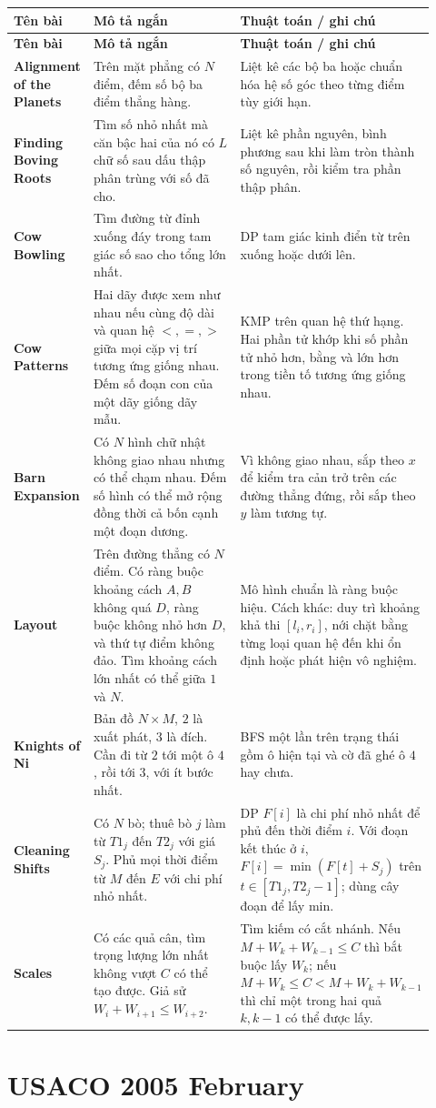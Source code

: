 \documentclass[11pt]{article}
\newenvironment{solutiontable}{%
  \small
  \setlength{\tabcolsep}{4pt}
  \renewcommand{\arraystretch}{1.14}
  \begin{longtable}{L{0.19\linewidth}L{0.39\linewidth}L{0.34\linewidth}}
  \toprule
  \textbf{Tên bài} & \textbf{Mô tả ngắn} & \textbf{Thuật toán / ghi chú}\\
  \midrule
  \endfirsthead
  \toprule
  \textbf{Tên bài} & \textbf{Mô tả ngắn} & \textbf{Thuật toán / ghi chú}\\
  \midrule
  \endhead
}{%
  \bottomrule
  \end{longtable}
  \normalsize
}
\newcommand{\problemrow}[3]{\textbf{#1} & #2 & #3\\\midrule}
\begin{document}
\begin{solutiontable}
\problemrow{Alignment of the Planets}{Trên mặt phẳng có \(N\) điểm, đếm số bộ ba điểm thẳng hàng.}{Liệt kê các bộ ba hoặc chuẩn hóa hệ số góc theo từng điểm tùy giới hạn.}
\problemrow{Finding Boving Roots}{Tìm số nhỏ nhất mà căn bậc hai của nó có \(L\) chữ số sau dấu thập phân trùng với số đã cho.}{Liệt kê phần nguyên, bình phương sau khi làm tròn thành số nguyên, rồi kiểm tra phần thập phân.}
\problemrow{Cow Bowling}{Tìm đường từ đỉnh xuống đáy trong tam giác số sao cho tổng lớn nhất.}{DP tam giác kinh điển từ trên xuống hoặc dưới lên.}
\problemrow{Cow Patterns}{Hai dãy được xem như nhau nếu cùng độ dài và quan hệ \(<,=,>\) giữa mọi cặp vị trí tương ứng giống nhau. Đếm số đoạn con của một dãy giống dãy mẫu.}{KMP trên quan hệ thứ hạng. Hai phần tử khớp khi số phần tử nhỏ hơn, bằng và lớn hơn trong tiền tố tương ứng giống nhau.}
\problemrow{Barn Expansion}{Có \(N\) hình chữ nhật không giao nhau nhưng có thể chạm nhau. Đếm số hình có thể mở rộng đồng thời cả bốn cạnh một đoạn dương.}{Vì không giao nhau, sắp theo \(x\) để kiểm tra cản trở trên các đường thẳng đứng, rồi sắp theo \(y\) làm tương tự.}
\problemrow{Layout}{Trên đường thẳng có \(N\) điểm. Có ràng buộc khoảng cách \(A,B\) không quá \(D\), ràng buộc không nhỏ hơn \(D\), và thứ tự điểm không đảo. Tìm khoảng cách lớn nhất có thể giữa \(1\) và \(N\).}{Mô hình chuẩn là ràng buộc hiệu. Cách khác: duy trì khoảng khả thi \([l_i,r_i]\), nới chặt bằng từng loại quan hệ đến khi ổn định hoặc phát hiện vô nghiệm.}
\problemrow{Knights of Ni}{Bản đồ \(N\times M\), \(2\) là xuất phát, \(3\) là đích. Cần đi từ \(2\) tới một ô \(4\), rồi tới \(3\), với ít bước nhất.}{BFS một lần trên trạng thái gồm ô hiện tại và cờ đã ghé ô \(4\) hay chưa.}
\problemrow{Cleaning Shifts}{Có \(N\) bò; thuê bò \(j\) làm từ \(T1_j\) đến \(T2_j\) với giá \(S_j\). Phủ mọi thời điểm từ \(M\) đến \(E\) với chi phí nhỏ nhất.}{DP \(F[i]\) là chi phí nhỏ nhất để phủ đến thời điểm \(i\). Với đoạn kết thúc ở \(i\), \(F[i]=\min(F[t]+S_j)\) trên \(t\in[T1_j,T2_j-1]\); dùng cây đoạn để lấy min.}
\problemrow{Scales}{Có các quả cân, tìm trọng lượng lớn nhất không vượt \(C\) có thể tạo được. Giả sử \(W_i+W_{i+1}\le W_{i+2}\).}{Tìm kiếm có cắt nhánh. Nếu \(M+W_k+W_{k-1}\le C\) thì bắt buộc lấy \(W_k\); nếu \(M+W_k\le C<M+W_k+W_{k-1}\) thì chỉ một trong hai quả \(k,k-1\) có thể được lấy.}
\end{solutiontable}

\section{USACO 2005 February}
\end{document}
